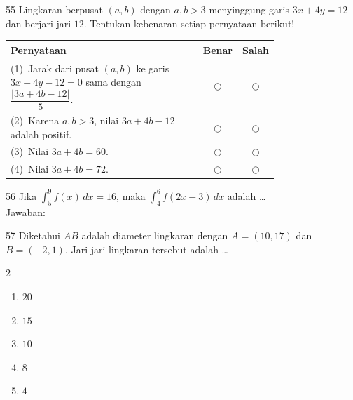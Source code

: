 \documentclass[11pt]{article}
\newenvironment{pilB}{%
  \par\smallskip\begin{multicols}{2}
  \begin{enumerate}[label=(\Alph*),leftmargin=*,itemsep=1pt,topsep=3pt]}%
  {\end{enumerate}\end{multicols}}
\begin{document}
\begin{soal}{55}
Lingkaran berpusat $(a,b)$ dengan $a,b>3$ menyinggung garis
$3x+4y=12$ dan berjari-jari $12$.
Tentukan kebenaran setiap pernyataan berikut!

\par\smallskip
{\renewcommand{\arraystretch}{1.4}%
\begin{tabular}{@{}p{0.76\linewidth}cc@{}}
\hline
\textbf{Pernyataan} & \textbf{Benar} & \textbf{Salah}\\
\hline
(1)~Jarak dari pusat $(a,b)$ ke garis $3x+4y-12=0$ sama dengan
    $\dfrac{|3a+4b-12|}{5}$.
  & $\bigcirc$ & $\bigcirc$\\
(2)~Karena $a,b>3$, nilai $3a+4b-12$ adalah positif.
  & $\bigcirc$ & $\bigcirc$\\
(3)~Nilai $3a+4b = 60$.
  & $\bigcirc$ & $\bigcirc$\\
(4)~Nilai $3a+4b = 72$.
  & $\bigcirc$ & $\bigcirc$\\
\hline
\end{tabular}}
\end{soal}

\begin{soal}{56}
Jika $\displaystyle\int_5^9 f(x)\,dx=16$, maka
$\displaystyle\int_4^6 f(2x-3)\,dx$ adalah \ldots\\[0.4em]
Jawaban:\enspace\underline{\hspace{4cm}}
\end{soal}

\begin{soal}{57}
Diketahui $AB$ adalah diameter lingkaran dengan $A=(10,17)$ dan
$B=(-2,1)$. Jari-jari lingkaran tersebut adalah \ldots
\begin{pilB}
  \item $20$ \item $15$ \item $10$ \item $8$ \item $4$
\end{pilB}
\end{soal}
\end{document}
